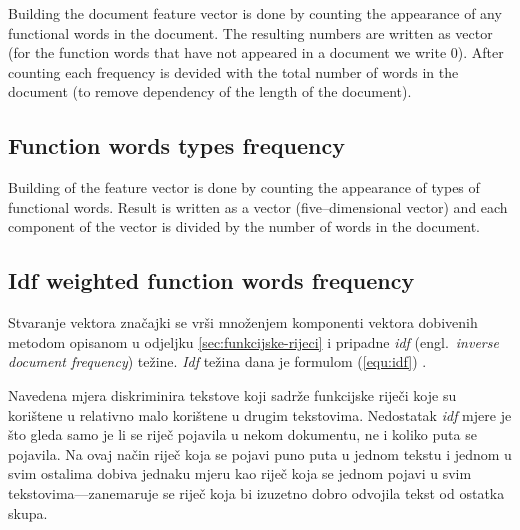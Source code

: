 \documentclass[11pt,english]{article}
\newcommand{\engl}[1]{(engl.~\emph{#1})}
\begin{document}
\begin{multicols}{2}
Building the document feature vector is done by counting the appearance of any
functional words in the document. The resulting numbers are written as vector
(for the function words that have not appeared in a document we write 0). After
counting each frequency is devided with the total number of words in the document
(to remove dependency of the length of the document).

\subsection{Function words types frequency}
\label{sec:funkcijske-rijeci-grupe}
% 

Building of the feature vector is done by counting the appearance of
types of functional words. Result is written as a vector (five--dimensional
vector) and each component of the vector is divided by the number of words in
the document.


\subsection{Idf weighted function words frequency}
\label{sec:funkcijske-rijeci-idf}
Stvaranje vektora značajki se vrši množenjem komponenti vektora dobivenih metodom
opisanom u odjeljku \ref{sec:funkcijske-rijeci} i pripadne \emph{idf} \engl{inverse
document frequency} težine. \emph{Idf} težina dana je formulom (\ref{equ:idf})
\citep{diederich2003authorship}.

Navedena mjera diskriminira tekstove koji sadrže funkcijske riječi koje su
korištene u relativno malo korištene u drugim tekstovima. Nedostatak \emph{idf}
mjere je što gleda samo je li se riječ pojavila u nekom dokumentu, ne i koliko
puta se pojavila. Na ovaj način riječ koja se pojavi puno puta u jednom
tekstu i jednom u svim ostalima dobiva jednaku mjeru kao riječ koja se jednom
pojavi u svim tekstovima---zanemaruje se riječ koja bi izuzetno dobro
odvojila tekst od ostatka skupa.


\end{multicols}
\end{document}
